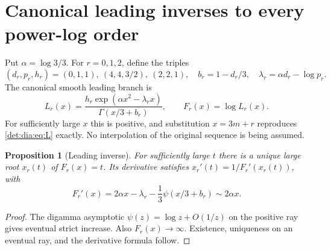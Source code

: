 \documentclass[11pt,letterpaper]{article}
\numberwithin{equation}{section}
\newtheorem{proposition}[theorem]{Proposition}
\theoremstyle{definition}\newtheorem{definition}[theorem]{Definition}
\theoremstyle{remark}\newtheorem{remark}[theorem]{Remark}
\begin{document}
\section{Canonical leading inverses to every power-log order}\label{det:dia:sec:inverses}
Put $\alpha=\log3/3$. For $r=0,1,2$, define the triples
\begin{equation}\label{det:dia:eq:params}
 (d_r,p_r,h_r)=(0,1,1),\ (4,4,3/2),\ (2,2,1),
 \quad b_r=1-d_r/3,\quad\lambda_r=\alpha d_r-\log p_r.
\end{equation}
The canonical smooth leading branch is
\begin{equation}\label{det:dia:eq:smoothL}
 L_r(x)=\frac{h_r\exp(\alpha x^2-\lambda_r x)}
 {\Gamma(x/3+b_r)},\qquad F_r(x)=\log L_r(x).
\end{equation}
For sufficiently large $x$ this is positive, and substitution
$x=3m+r$ reproduces \eqref{det:dia:eq:L} exactly. No interpolation of the
original sequence is being assumed.

\begin{proposition}[Leading inverse]\label{det:dia:prop:core}
For sufficiently large $t$ there is a unique large root $x_r(t)$ of
$F_r(x)=t$. Its derivative satisfies
$x_r'(t)=1/F_r'(x_r(t))$, with
\begin{equation}\label{det:dia:eq:Fprime}
 F_r'(x)=2\alpha x-\lambda_r-\frac13\psi(x/3+b_r)
 \sim2\alpha x.
\end{equation}
\end{proposition}
\begin{proof}
The digamma asymptotic $\psi(z)=\log z+O(1/z)$ on the positive ray
\cite{dlmf} gives eventual strict increase. Also $F_r(x)\to\infty$.
Existence, uniqueness on an eventual ray, and the derivative formula
follow.
\end{proof}
\end{document}
